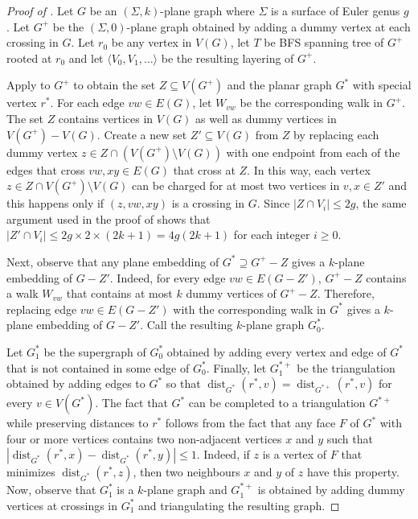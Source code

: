 \documentclass{patmorin}
\DeclareMathOperator{\dist}{dist}
\begin{document}
\begin{proof}[Proof of ]
  Let $G$ be an $(\Sigma,k)$-plane graph where $\Sigma$ is a surface of Euler genus $g$.  Let $G^+$ be the $(\Sigma,0)$-plane graph obtained by adding a dummy vertex at each crossing in $G$.  Let $r_0$ be any vertex in $V(G)$, let $T$ be BFS spanning tree of $G^+$ rooted at $r_0$ and let $\langle V_0,V_1,\ldots\rangle$ be the resulting layering of $G^+$.
    
  Apply  to $G^{+}$ to obtain the set $Z\subseteq V(G^{+})$ and the planar graph $G^*$ with special vertex $r^*$.  For each edge $vw\in E(G)$, let $W_{vw}$ be the corresponding walk in $G^+$. The set $Z$ contains vertices in $V(G)$ as well as dummy vertices in $V(G^+)-V(G)$. Create a new set $Z'\subseteq V(G)$ from $Z$ by replacing each dummy vertex $z\in Z\cap (V(G^+)\setminus V(G))$ with one endpoint from each of the edges that cross $vw,xy\in E(G)$ that cross at $Z$.  In this way, each vertex $z\in Z\cap V(G^+)\setminus V(G)$ can be charged for at most two vertices in $v,x\in Z'$ and this happens only if $(z,vw,xy)$ is a crossing in $G$.
  Since $|Z\cap V_i| \le 2g$, the same argument used in the proof of  shows that $|Z'\cap V_i|\le 2g\times 2\times (2k+1) = 4g(2k+1)$ for each integer $i\ge 0$.
  
  
  Next, observe that any plane embedding of $G^*\supseteq G^+-Z$ gives a $k$-plane embedding of $G-Z'$. Indeed, for every edge $vw\in E(G-Z')$, $G^+-Z$ contains a walk $W_{vw}$ that contains at most $k$ dummy vertices of $G^+-Z$.  Therefore, replacing edge $vw\in E(G-Z')$ with the corresponding walk in $G^*$ gives a $k$-plane embedding of $G-Z'$.  Call the resulting $k$-plane graph $G^*_0$.
  
  Let $G^*_1$ be the supergraph of $G^*_0$ obtained by adding every vertex and edge of $G^*$ that is not contained in some edge of $G^*_0$.  Finally, let $G^{*+}_1$ be the triangulation obtained by adding edges to $G^*$ so that $\dist_{G^*}(r^*,v)=\dist_{G^{*+}}(r^*,v)$ for every $v\in V(G^*)$.  The fact that $G^*$ can be completed to a triangulation $G^{*+}$ while preserving distances to $r^*$ follows from the fact that any face $F$ of $G^*$ with four or more vertices contains two non-adjacent vertices $x$ and $y$ such that $|\dist_{G^*}(r^*,x)-\dist_{G^*}(r^*,y)|\le 1$.  Indeed, if $z$ is a vertex of $F$ that minimizes $\dist_{G^*}(r^*,z)$, then two neighbours $x$ and $y$ of $z$ have this property. Now, observe that $G^*_1$ is a $k$-plane graph and $G^{*+}_1$ is obtained by adding dummy vertices at crossings in $G^*_1$ and triangulating the resulting graph.    
  

\end{proof}
\end{document}
